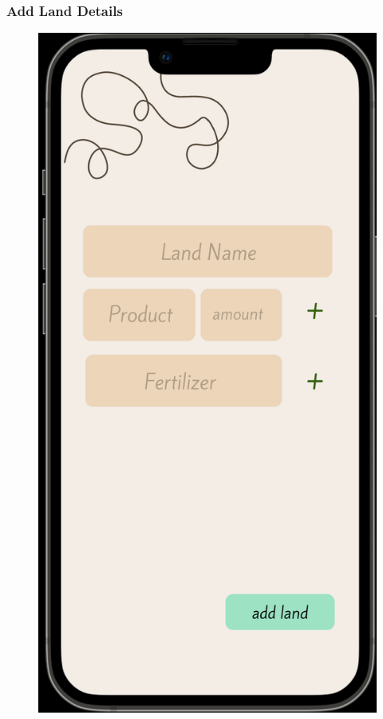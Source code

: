 \subsubsection{Add Land Details}
    \begin{figure}[ht]
        \centering
        \includegraphics[width = 0.5\linewidth]{figures/addingland.png}
        \label{fig:profile}
    \end{figure}
\clearpage

